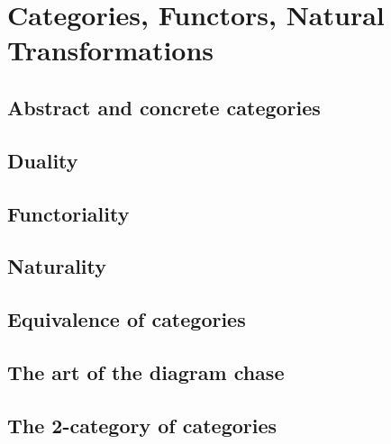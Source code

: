 \documentclass[main.tex]{subfiles}
\begin{document}
\chapter{Categories, Functors, Natural Transformations}
\section{Abstract and concrete categories}
\section{Duality}

% 
% 
\section{Functoriality}
\section{Naturality}
\section{Equivalence of categories}
\section{The art of the diagram chase}
\section{The 2-category of categories}
\end{document}
